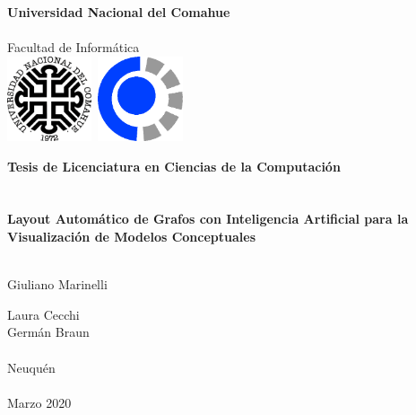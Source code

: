 
\titlepage

\begin{center}
\ \\
\ \\
\vspace{-1cm}
 

\ \\

\vspace{0.5cm}
{\Large{\bf \sc Universidad Nacional del Comahue}}\\

\ \\
{\Large { \sc Facultad de Informática}}\\

\vspace{-2.5cm}
\mbox{\hspace{-1cm}\includegraphics[width=2.5cm,height=2.5cm]{imagenes/unc.png}\hspace{13cm} \includegraphics[width=2.5cm,height=2.5cm]{imagenes/fai.png}}


\vspace{6cm}

{\Large {\bf\sc Tesis de Licenciatura en Ciencias de la Computaci\'on}}\\
\ \\
\ \\
{\LARGE {\bf Layout Automático de Grafos con  Inteligencia Artificial para la Visualización de Modelos Conceptuales \\
}}\ \\
\vspace{3cm}



{\Large Giuliano Marinelli}\\
\vspace{2cm}

{\Large Laura Cecchi}\\

{\Large Germán Braun}\\
\ \\



\vfill
{\Large {\sc Neuqu\'en}\hspace{6cm}{\sc Argentina}}\\
\ \\

{\Large Marzo 2020}\\

\end{center}

\pagebreak

